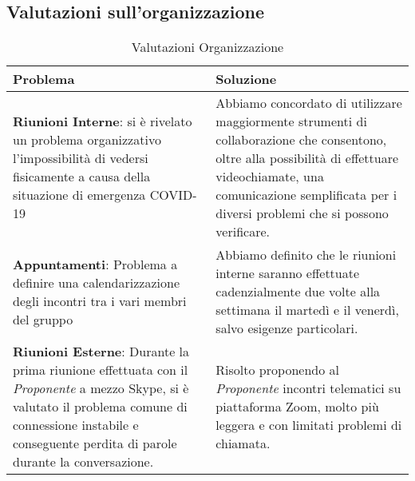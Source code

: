 \subsection{Valutazioni sull'organizzazione}
	\begin{longtable}{ 
		>{\centering}p{} 
		>{\centering\arraybackslash}p{}}
	
		\caption {Valutazioni Organizzazione}		\\
		
		\textbf{\color{white}Problema} &
		\textbf{\color{white}Soluzione}
		\tabularnewline  
		\endhead
		
		\textbf{Riunioni Interne}: si è rivelato un problema organizzativo l'impossibilità di vedersi fisicamente a causa della situazione di emergenza COVID-19\ped{\textit{G}} & Abbiamo concordato di utilizzare maggiormente strumenti di collaborazione che consentono, oltre alla possibilità di effettuare videochiamate, una comunicazione semplificata per i diversi problemi che si possono verificare. \\
		
		\textbf{Appuntamenti}: Problema a definire una calendarizzazione degli incontri tra i vari membri del gruppo & Abbiamo definito che le riunioni interne saranno effettuate cadenzialmente due volte alla settimana il martedì e il venerdì, salvo esigenze particolari.\\
		
		\textbf{Riunioni Esterne}: Durante la prima riunione effettuata con il \textit{Proponente}\ped{\textit{G}} a mezzo Skype\ped{\textit{G}}, si è valutato il problema comune di connessione instabile e conseguente perdita di parole durante la conversazione. & Risolto proponendo al \textit{Proponente}\ped{\textit{G}}	incontri telematici su piattaforma Zoom\ped{\textit{G}}, molto più leggera e con limitati problemi di chiamata.\\
				
		\end{longtable}

\pagebreak
